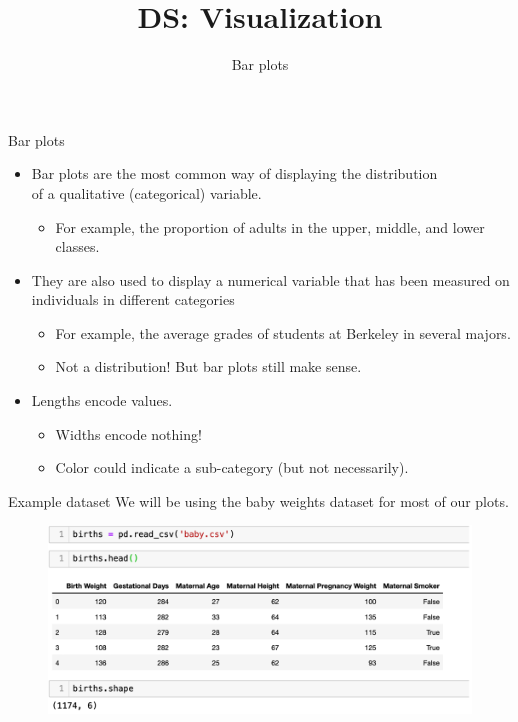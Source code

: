 \documentclass[aspectratio=169]{../latex_main/tntbeamer}  %
\title[Visualization]{DS: Visualization}
\subtitle{Bar plots}
\begin{document}
	
	\maketitle
	\begin{frame}{Bar plots}
	    \begin{itemize}
	        \item Bar plots are the most common way of displaying the distribution\\ of a qualitative (categorical) variable.
	        \begin{itemize}
	            \item For example, the proportion of adults in the upper, middle, and lower classes.
	        \end{itemize}
	        \pause
	        \item They are also used to display a numerical variable that has been measured on individuals in different categories
	        \begin{itemize}
	            \item For example, the average grades of students at Berkeley in several majors.
	            \item Not a distribution! But bar plots still make sense.
	        \end{itemize}
	        \pause
	        \item Lengths encode values.
	        \begin{itemize}
	            \item Widths encode nothing!
	            \item Color could indicate a sub-category (but not necessarily).
	        \end{itemize}
	    \end{itemize}
	\end{frame}
	
	
	
	\begin{frame}{Example dataset}
	    We will be using the baby weights dataset for most of our plots.
	    \begin{figure}
	        \centering
            \includegraphics[scale=.45]{Bild21}
	    \end{figure}
	\end{frame}
	
\end{document}
